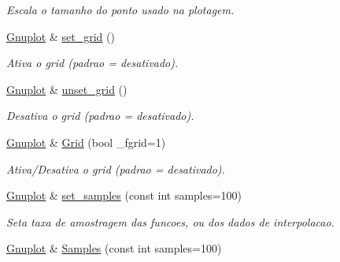 \begin{DoxyCompactItemize}
\begin{DoxyCompactList}\small\item\em Escala o tamanho do ponto usado na plotagem. \end{DoxyCompactList}\item 
\hypertarget{classGnuplot_a4b7245b12dad1c0ef326e5f59eb83001}{\hyperlink{classGnuplot}{Gnuplot} \& \hyperlink{classGnuplot_a4b7245b12dad1c0ef326e5f59eb83001}{set\-\_\-grid} ()}\label{classGnuplot_a4b7245b12dad1c0ef326e5f59eb83001}

\begin{DoxyCompactList}\small\item\em Ativa o grid (padrao = desativado). \end{DoxyCompactList}\item 
\hypertarget{classGnuplot_a8b9a16d5793c3f4939b917b2c263860c}{\hyperlink{classGnuplot}{Gnuplot} \& \hyperlink{classGnuplot_a8b9a16d5793c3f4939b917b2c263860c}{unset\-\_\-grid} ()}\label{classGnuplot_a8b9a16d5793c3f4939b917b2c263860c}

\begin{DoxyCompactList}\small\item\em Desativa o grid (padrao = desativado). \end{DoxyCompactList}\item 
\hypertarget{classGnuplot_a67e669cdac3b09ae16678f5211dda786}{\hyperlink{classGnuplot}{Gnuplot} \& \hyperlink{classGnuplot_a67e669cdac3b09ae16678f5211dda786}{Grid} (bool \-\_\-fgrid=1)}\label{classGnuplot_a67e669cdac3b09ae16678f5211dda786}

\begin{DoxyCompactList}\small\item\em Ativa/\-Desativa o grid (padrao = desativado). \end{DoxyCompactList}\item 
\hypertarget{classGnuplot_a671cbe7b18a267ea59f532c83a0035f6}{\hyperlink{classGnuplot}{Gnuplot} \& \hyperlink{classGnuplot_a671cbe7b18a267ea59f532c83a0035f6}{set\-\_\-samples} (const int samples=100)}\label{classGnuplot_a671cbe7b18a267ea59f532c83a0035f6}

\begin{DoxyCompactList}\small\item\em Seta taxa de amostragem das funcoes, ou dos dados de interpolacao. \end{DoxyCompactList}\item 
\hypertarget{classGnuplot_a0be7d1bfb41fd1e44969361ab02320b9}{\hyperlink{classGnuplot}{Gnuplot} \& \hyperlink{classGnuplot_a0be7d1bfb41fd1e44969361ab02320b9}{Samples} (const int samples=100)}\label{classGnuplot_a0be7d1bfb41fd1e44969361ab02320b9}


\end{DoxyCompactItemize}
